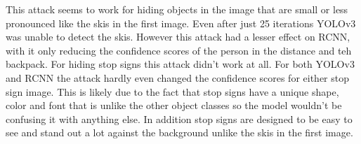 \documentclass{article}
\begin{document}
This attack seems to work for hiding objects in the image that are small or less pronounced like the skis in the first image. Even after just 25 iterations YOLOv3 was unable to detect the skis. However this attack had a lesser effect on RCNN, with it only reducing the confidence scores of the person in the distance and teh backpack. For hiding stop signs this attack didn't work at all. For both YOLOv3 and RCNN the attack hardly even changed the confidence scores for either stop sign image. This is likely due to the fact that stop signs have a unique shape, color and font that is unlike the other object classes so the model wouldn't be confusing it with anything else. In addition stop signs are designed to be easy to see and stand out a lot against the background unlike the skis in the first image.



\end{document}
